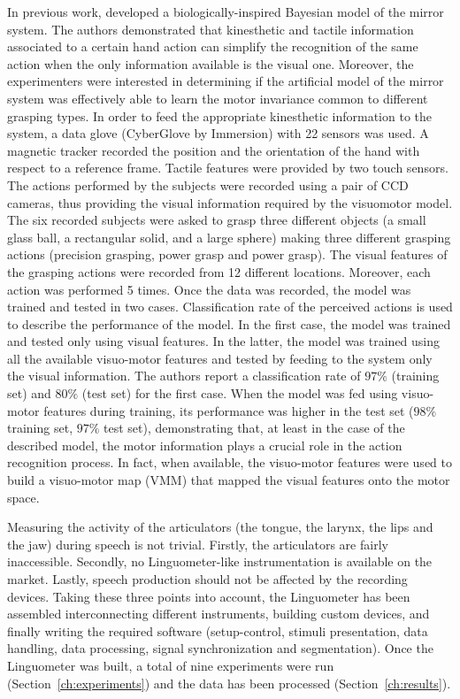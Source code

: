In previous work,
\citet{metta.etal:2006} developed a biologically-inspired Bayesian model of
the mirror system.
The authors demonstrated that kinesthetic and tactile information associated to
a certain hand action can simplify the recognition of the same action when the
only information available is the visual one.
Moreover, the experimenters were interested in determining if the artificial
model
of the mirror system was effectively able to learn the motor invariance common
to different grasping types.
In order to feed the appropriate kinesthetic information to the system, a data
glove (CyberGlove by Immersion) with 22 sensors was used.
A magnetic tracker recorded the position and the orientation of the hand with
respect to a reference frame.
Tactile features were provided by two touch sensors. The actions performed by
the subjects were recorded using a pair of CCD cameras, thus providing the
visual information required by the visuomotor model. 
The six recorded subjects were asked to grasp three different objects 
(a small glass ball, a rectangular solid, and a large sphere) making three
different grasping actions (precision grasping, power grasp and power
grasp).
The visual features of the grasping actions were recorded from 12 different
locations. Moreover, each action was performed 5 times.
Once the data was recorded, the model was
trained and tested in two cases. Classification rate of the perceived actions is
used to describe the performance of the model.
In the first case, the model was trained and tested only using visual
features.
In the latter, the model was trained using all the available visuo-motor 
features and tested by feeding to the system only the visual
information.
The authors report a classification rate of $97\%$ (training set) and $80\%$
(test set) for the first case. 
When the model was fed using visuo-motor features during training, its
performance was higher in the test set ($98\%$ training set, $97\%$ test 
set), demonstrating that, at least in the case of the described model, the
motor information plays a crucial role in the action recognition process.
In fact, when available, the visuo-motor features were used to build a
visuo-motor map (VMM) that mapped the visual features onto the motor space.

Measuring the activity of the articulators (the tongue, the larynx, the lips and
the jaw) during speech is not trivial. 
Firstly, the articulators are fairly inaccessible.
Secondly, no Linguometer-like instrumentation is available on the market.
Lastly, speech production should not be affected by the recording devices.
Taking these three points into account, the Linguometer has been assembled 
interconnecting different instruments, building custom devices, and finally
writing the required software (setup-control, stimuli presentation, data
handling, data processing, signal synchronization and segmentation).
Once the Linguometer was built, a total of nine
experiments were run (Section~\ref{ch:experiments}) and the data has been
processed (Section~\ref{ch:results}).\\

